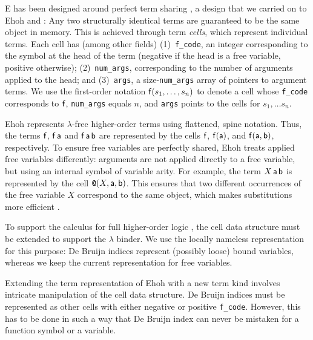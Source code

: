 E has been designed around perfect term sharing %
\cite{ls-01-shared}, a design that we carried on to  Ehoh and \ehohii{}: Any two structurally identical terms are
guaranteed to be the same object in memory. This is achieved through term
\emph{cells}, which represent individual terms. Each cell has (among other fields)
(1)~\texttt{f\_code}, an integer corresponding to the symbol at the head of the term (negative
if the head is a free variable, positive otherwise); (2)~\texttt{num\_args},
corresponding to the number of arguments applied to the head; and (3)~\texttt{args},
a size-\texttt{num\_args} array of pointers to argument terms. We
use the first-order notation $\mathsf{f}(s_1, \ldots, s_n)$ to denote a cell whose
\texttt{f\_code} corresponds to $\mathsf{f}$, \texttt{num\_args} equals $n$, and
\texttt{args} points to the cells for $s_1, \ldots s_n$.

Ehoh represents $\lambda$-free higher-order terms using flattened, spine notation.
Thus, the terms $\mathsf{f}$, $\mathsf{f} \, \mathsf{a}$ and $\mathsf{f} \, \mathsf{a} \,
\mathsf{b}$ are represented by the cells $\mathsf{f}$,
$\mathsf{f}(\mathsf{a})$, and $\mathsf{f}(\mathsf{a}, \mathsf{b})$, respectively.
To ensure free variables are
perfectly shared, Ehoh treats applied free variables differently: arguments are
not applied directly to a free variable, but using an internal symbol
\internalat{} of variable arity. For example, the term $X \, \mathsf{a} \, \mathsf{b}$ is
represented by the cell $\texttt{@}(X, \mathsf{a}, \mathsf{b})$. This ensures that
two different occurrences of the free variable $X$ correspond to the same object,
which makes substitutions more efficient \cite{section-ehoh}.

 To support the calculus for full
higher-order logic \cite{bbtv-21-full-ho-sup}, the cell data structure must
be extended to support the $\lambda$ binder. We use the locally nameless
representation \cite{ac-12-locally-nameless} for this purpose: De Bruijn indices
represent (possibly loose) bound variables, whereas we keep the current
representation for free variables.

Extending the term representation of Ehoh with a new term
kind involves intricate manipulation of the cell data structure. De Bruijn
indices must be represented as other cells with either negative or positive
\texttt{f\_code}. However, this has to be done in such a way that De Bruijn
index can never be mistaken for a function symbol or a variable.

